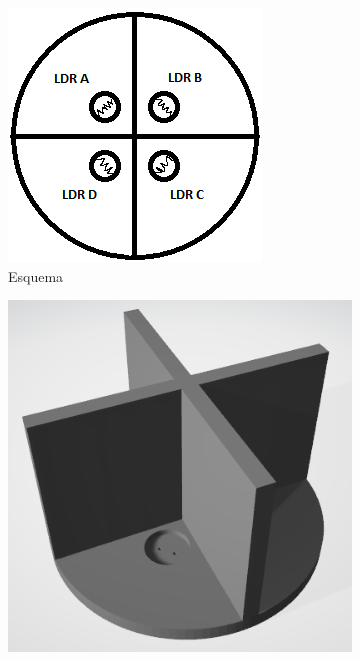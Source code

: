 \documentclass[12pt]{article}
\begin{document}
\begin{figure}[H]
  \centering
  \begin{subfigure}[b]{0.31\linewidth}
    \includegraphics[width=\linewidth]{imgs/LDR_display_draft.png}
    \caption{Esquema}
  \end{subfigure}
  \begin{subfigure}[b]{0.3\linewidth}
    \includegraphics[width=\linewidth]{imgs/LDR_STAND_RENDER.png}

\end{subfigure}
\end{figure}
\end{document}
